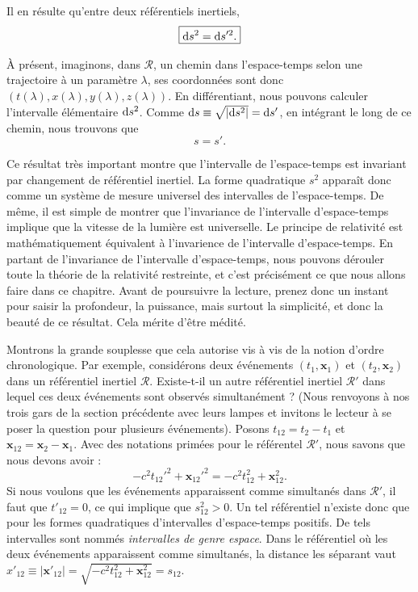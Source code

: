 		Il en résulte qu'entre deux référentiels inertiels,
		\begin{equation}
			\boxed{		
			\mathrm{d} s^2 = \mathrm{d} s'^2.
			}
		\end{equation}


		À présent, imaginons, dans $\mathscr{R}$, un chemin dans l'espace-temps selon une trajectoire à  un paramètre $\lambda$, ses coordonnées sont donc $(t(\lambda),x(\lambda),y(\lambda),z(\lambda))$. En différentiant, nous pouvons calculer l'intervalle élémentaire $\mathrm{d} s^2$. Comme $\mathrm{d} s \equiv \sqrt{|\mathrm{d} s^2|}=\mathrm{d} s'$, en intégrant le long de ce chemin, nous trouvons que
		\begin{equation}
		 	 \boxed{ s=s'. }
		\end{equation}

		Ce résultat très important montre que l'intervalle de l'espace-temps est invariant par changement de référentiel inertiel. La forme quadratique $s^2$ apparaît donc comme un système de mesure universel des intervalles de l'espace-temps. De même, il est simple de montrer que l'invariance de l'intervalle d'espace-temps implique que la vitesse de la lumière est universelle. Le principe de relativité est mathématiquement équivalent à l'invarience de l'intervalle d'espace-temps. En partant de l'invariance de l'intervalle d'espace-temps, nous pouvons dérouler toute la théorie de la relativité restreinte, et c'est précisément ce que nous allons faire dans ce chapitre. Avant de poursuivre la lecture, prenez donc un instant pour saisir la profondeur, la puissance, mais surtout la simplicité, et donc la beauté de ce résultat. Cela mérite d'être médité.



		Montrons la grande souplesse que cela autorise vis à vis de la notion d'ordre chronologique. Par exemple, considérons deux événements $(t_1,\bm{x}_1)$ et $(t_2,\bm{x}_2)$ dans un référentiel inertiel $\mathscr{R}$. Existe-t-il un autre référentiel inertiel $\mathscr{R}'$ dans lequel ces deux événements sont observés simultanément ? (Nous renvoyons à nos trois gars de la section précédente avec leurs lampes et invitons le lecteur à se poser la question pour plusieurs événements). Posons $t_{12}=t_2-t_1$ et $\bm{x}_{12}=\bm{x}_2-\bm{x}_1$. Avec des notations primées pour le référentel $\mathscr{R}'$, nous savons que nous devons avoir :
		\begin{equation}
			-c^2t_{12}'^2+\bm{x}_{12}'^2=-c^2t_{12}^2+\bm{x}_{12}^2.
		\end{equation}
		Si nous voulons que les événements apparaissent comme simultanés dans $\mathscr{R}'$, il faut que $t'_{12}=0$, ce qui implique que $s_{12}^2>0$. Un tel référentiel n'existe donc que pour les formes quadratiques d'intervalles d'espace-temps positifs. De tels intervalles sont nommés \emph{intervalles de genre espace}. Dans le référentiel où les deux événements apparaissent comme simultanés, la distance les séparant vaut $x'_{12}\equiv |\bm{x}'_{12}|= \sqrt{-c^2t_{12}^2+\bm{x}_{12}^2}=s_{12}$.

